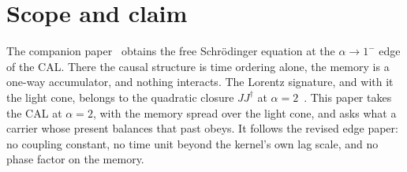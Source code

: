 \documentclass[11pt]{amsart}
\theoremstyle{definition}
\theoremstyle{remark}
\begin{document}
\begin{abstract}
\emph{Unitarity, the readout, and Feynman's kernel.}
\begin{itemize}
\item Each sign of frequency evolves by a unitary group generated by $\sqrt{m^2c^4-\hbar^2c^2\nabla^2}$.
\item On the positive-frequency sector the trace of the carrier closure, $\int JJ^\dagger$, is conserved, so the trace readout keeps its normalization in every frame. On mixed frequencies it is not, in general.
\item Nothing near $\alpha=2$ selects a sign of frequency. As at the edge, the sign is inherited from the source's past.
\item Removing the rest phase and letting $c\to\infty$, the positive-frequency part of the light-cone path sum converges to Feynman's free kernel with error $O(1/c^2)$, and its composition law is Feynman's time slicing.
\end{itemize}
The $\alpha=2$ dynamics is real. The $i$ of Feynman's kernel enters only through the sign of frequency inherited from the source.

Numerical runs and independent machine checks confirm each statement.
\end{abstract}

\maketitle
\tableofcontents

\section{Scope and claim}

The companion paper~\cite{Edge} obtains the free Schr\"odinger equation at the $\alpha\to1^-$ edge of the CAL. There the causal structure is time ordering alone, the memory is a one-way accumulator, and nothing interacts. The Lorentz signature, and with it the light cone, belongs to the quadratic closure $JJ^\dagger$ at $\alpha=2$~\cite{CAL,Edge}. This paper takes the CAL at $\alpha=2$, with the memory spread over the light cone, and asks what a carrier whose present balances that past obeys. It follows the revised edge paper: no coupling constant, no time unit beyond the kernel's own lag scale, and no phase factor on the memory.
\end{document}
